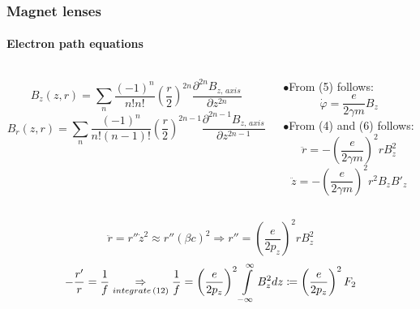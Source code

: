 \documentclass[10pt]{beamer}
\newcommand{\bull}{$\bullet$}
\newcommand{\rfn}{\setcounter{footnote}{0}}
\begin{document}
\begin{frame}
  \frametitle{Magnet lenses}
  \framesubtitle{Electron path equations}
  \rfn
  \begin{scriptsize}
  \begin{columns}
    \begin{column}{0.6\textwidth}
      \begin{equation}
        B_{z}\left(z,r\right)=\underset{n}{\sum}\frac{\left(-1\right)^{n}}{n!n!}\left(\frac{r}{2}\right)^{2n}\frac{\partial^{2n}B_{z,\,axis}}{\partial z^{2n}}
      \end{equation}
      \begin{equation}
        B_{r}\left(z,r\right)=\underset{n}{\sum}\frac{\left(-1\right)^{n}}{n!\left(n-1\right)!}\left(\frac{r}{2}\right)^{2n-1}\frac{\partial^{2n-1}B_{z,\,axis}}{\partial z^{2n-1}}
      \end{equation}
    \end{column}
    \begin{column}{0.5\textwidth}
      \bull From (5) follows:
      \begin{equation}
        \dot{\varphi}=\frac{e}{2\gamma m}B_{z}
      \end{equation}
      \bull From (4) and (6) follows:
      \begin{equation}
        \ddot{r}=-\left(\frac{e}{2\gamma m}\right)^{2}rB_{z}^{2}
      \end{equation}
      \begin{equation}
        \ddot{z}=-\left(\frac{e}{2\gamma m}\right)^{2}r^{2}B_{z}B'_{z}
      \end{equation}
    \end{column}
  \end{columns}
  \begin{equation}
    \ddot{r}=r''\dot{z}^{2}\approx r''\left(\beta c\right)^{2}\Rightarrow r''=\left(\frac{e}{2p_{z}}\right)^{2}rB_{z}^{2}
  \end{equation}
  \begin{equation}
    -\frac{r'}{r}=\frac{1}{f}\underset{integrate\,(12)}{\Rightarrow}\frac{1}{f}=\left(\frac{e}{2p_{z}}\right)^{2}\intop_{-\infty}^{\infty}B_{z}^{2}dz\coloneqq\left(\frac{e}{2p_{z}}\right)^{2}F_{2}
  \end{equation}
  \end{scriptsize}
\end{frame}
\end{document}
